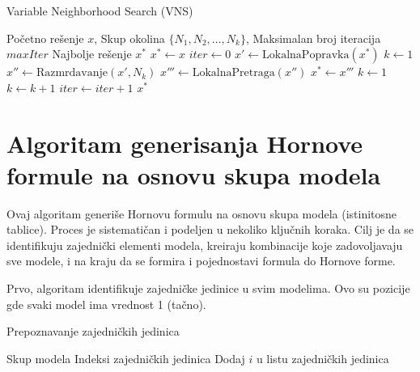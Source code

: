 \documentclass[12pt,oneside]{memoir}
\begin{document}
\begin{algorithm}[H]
\caption{Variable Neighborhood Search (VNS)}
\renewcommand{\algorithmicrequire}{\textbf{Input:}}
\renewcommand{\algorithmicensure}{\textbf{Output:}}
\begin{algorithmic}[1]
\REQUIRE Početno rešenje $x$, Skup okolina $\{N_1, N_2, \ldots, N_k\}$, Maksimalan broj iteracija $maxIter$
\ENSURE Najbolje rešenje $x^*$
\STATE $x^* \gets x$
\STATE $iter \gets 0$
    \STATE $x' \gets \text{LokalnaPopravka}(x^*)$ 
    \STATE $k \gets 1$
        \STATE $x'' \gets \text{Razmrdavanje}(x', N_k)$ 
        \STATE $x''' \gets \text{LokalnaPretraga}(x'')$ 
            \STATE $x^* \gets x'''$
            \STATE $k \gets 1$
        \ELSE
            \STATE $k \gets k + 1$
        \ENDIF
    \ENDWHILE
    \STATE $iter \gets iter + 1$
\ENDWHILE
\RETURN $x^*$
\end{algorithmic}
\end{algorithm}


\section{Algoritam generisanja Hornove formule na osnovu skupa modela}

Ovaj algoritam generiše Hornovu formulu na osnovu skupa modela (istinitosne tablice). Proces je sistematičan i podeljen u nekoliko ključnih koraka. Cilj je da se identifikuju zajednički elementi modela, kreiraju kombinacije koje zadovoljavaju sve modele, i na kraju da se formira i pojednostavi formula do Hornove forme.

Prvo, algoritam identifikuje zajedničke jedinice u svim modelima. Ovo su pozicije gde svaki model ima vrednost 1 (tačno).

\begin{algorithm}[H]
\caption{Prepoznavanje zajedničkih jedinica}
\renewcommand{\algorithmicrequire}{\textbf{Input:}}
\renewcommand{\algorithmicensure}{\textbf{Output:}}
\begin{algorithmic}[1]
\REQUIRE Skup modela
\ENSURE Indeksi zajedničkih jedinica
        \STATE Dodaj $i$ u listu zajedničkih jedinica
    \ENDIF
\ENDFOR
\end{algorithmic}
\end{algorithm}
\end{document}
